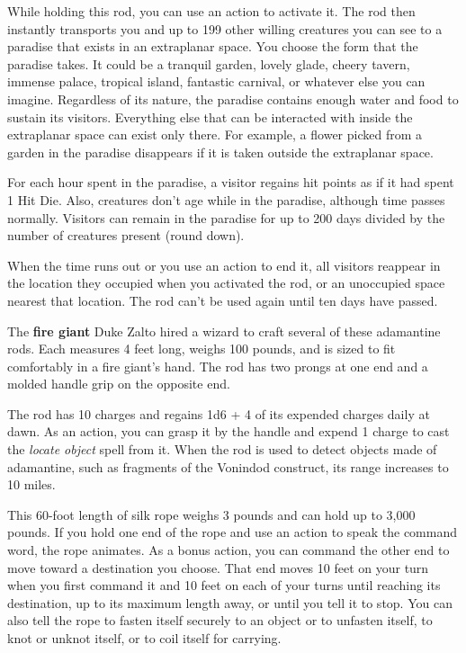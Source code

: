\documentclass[10pt,a4paper,twoside,bg=print,twocolumn,openany,nodeprecatedcode]{dndbook}
\begin{document}
While holding this rod, you can use an action to activate it. The rod then instantly transports you and up to 199 other willing creatures you can see to a paradise that exists in an extraplanar space. You choose the form that the paradise takes. It could be a tranquil garden, lovely glade, cheery tavern, immense palace, tropical island, fantastic carnival, or whatever else you can imagine. Regardless of its nature, the paradise contains enough water and food to sustain its visitors. Everything else that can be interacted with inside the extraplanar space can exist only there. For example, a flower picked from a garden in the paradise disappears if it is taken outside the extraplanar space.

For each hour spent in the paradise, a visitor regains hit points as if it had spent 1 Hit Die. Also, creatures don't age while in the paradise, although time passes normally. Visitors can remain in the paradise for up to 200 days divided by the number of creatures present (round down).

When the time runs out or you use an action to end it, all visitors reappear in the location they occupied when you activated the rod, or an unoccupied space nearest that location. The rod can't be used again until ten days have passed.

The \textbf{fire giant} Duke Zalto hired a wizard to craft several of these adamantine rods. Each measures 4 feet long, weighs 100 pounds, and is sized to fit comfortably in a fire giant's hand. The rod has two prongs at one end and a molded handle grip on the opposite end.

The rod has 10 charges and regains 1d6 + 4 of its expended charges daily at dawn. As an action, you can grasp it by the handle and expend 1 charge to cast the \textit{locate object} spell from it. When the rod is used to detect objects made of adamantine, such as fragments of the Vonindod construct, its range increases to 10 miles.

This 60-foot length of silk rope weighs 3 pounds and can hold up to 3,000 pounds. If you hold one end of the rope and use an action to speak the command word, the rope animates. As a bonus action, you can command the other end to move toward a destination you choose. That end moves 10 feet on your turn when you first command it and 10 feet on each of your turns until reaching its destination, up to its maximum length away, or until you tell it to stop. You can also tell the rope to fasten itself securely to an object or to unfasten itself, to knot or unknot itself, or to coil itself for carrying.
\end{document}

